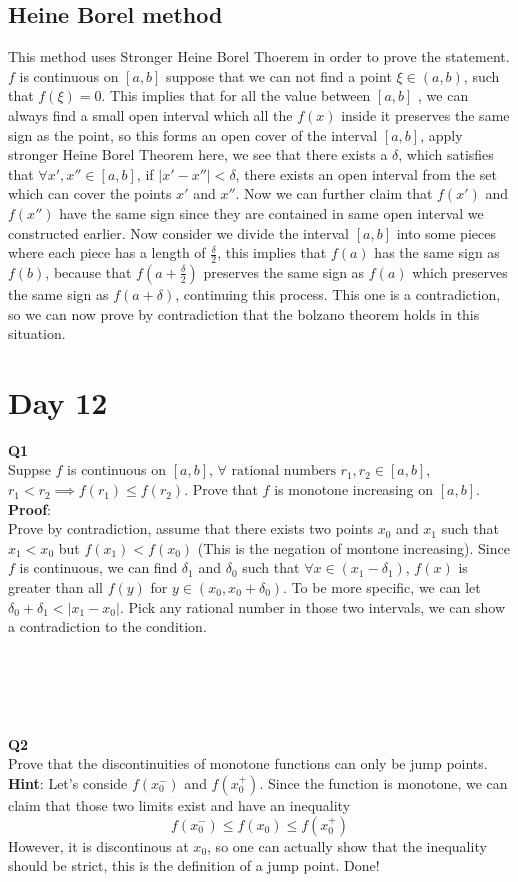 \documentclass{article}
\newcommand{\tb}[1]{\textbf{#1}}
\begin{document}
\subsection{Heine Borel method}
This method uses Stronger Heine Borel Thoerem in order to prove the statement. $f$ is continuous on $[a,b]$ suppose that we can not find a point $\xi \in (a,b)$, such 
that $f(\xi) = 0$. This implies that for all the value between $[a,b]$ , we can always find a small open interval which all the $f(x)$ inside it preserves the same sign 
as the point, so this forms an open cover of the interval $[a,b]$, apply stronger Heine Borel Theorem here, we see that there exists a $\delta$, which satisfies that 
$\forall x', x'' \in [a,b]$, if $|x' - x''| < \delta$, there exists an open interval from the set which can cover the points $x'$ and $x''$. Now we can further 
claim that $f(x')$ and $f(x'')$ have the same sign since they are contained in same open interval we constructed earlier. Now consider we divide the interval $[a,b]$ into some
pieces where each piece has a length of $\frac{\delta}{2}$, this implies that $f(a)$ has the same sign as $f(b)$, because that $f(a+\frac{\delta}{2})$ preserves the same sign as 
$f(a)$ which preserves the same sign as $f(a + \delta)$, continuing this process. This one is a contradiction, so we can now prove by contradiction 
that the bolzano theorem holds in this situation.\\
\newpage
\section{Day 12}
\tb{Q1}\\
Suppse $f$ is continuous on $[a,b]$, $\forall \text{ rational numbers }r_1, r_2 \in [a,b]$, $r_1 < r_2 \implies f(r_1) \leq f(r_2)$. Prove that $f$ is monotone increasing on $[a,b]$.\\
\tb{Proof}:\\
Prove by contradiction, assume that there exists two points $x_0$ and $x_1$ such that $x_1 < x_0$ but $f(x_1) < f(x_0)$ (This is the negation of montone increasing). Since $f$ is 
continuous, we can find $\delta_1$ and $\delta_0$ such that $\forall x \in (x_1 - \delta_1)$, $f(x)$ is greater than all $f(y)$ for $y \in  (x_0, x_0 + \delta_0)$. To be more specific, 
we can let $\delta_0 + \delta_1 < |x_1 - x_0|$. Pick any rational number in those two intervals, we can show a contradiction to the condition.\\
\\
\\
\\
\\
\\
\tb{Q2}\\
Prove that the discontinuities of monotone functions can only be jump points.\\
\tb{Hint}: Let's conside $f(x_0^-)$ and $f(x_0^+)$. Since the function is monotone, we can claim that those two limits exist and have an inequality 
$$
f(x_0^-) \leq f(x_0) \leq f(x_0 ^ +)
$$
However, it is discontinous at $x_0$, so one can actually show that the inequality should be strict, this is the definition of a jump point. Done!
\end{document}
